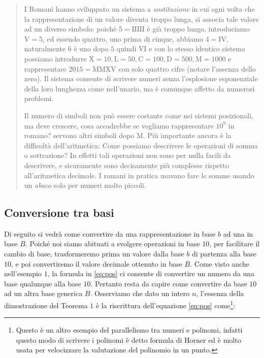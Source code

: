 \begin{quote}
I Romani hanno sviluppato un sistema a
\emph{sostituzione} in cui ogni volta che la rappresentazione di un valore
diventa troppo lunga, si associa tale valore ad un diverso simbolo: poiché $5 =
\mathrm{IIIII}$ è già troppo lungo, introduciamo $\mathrm{V} = 5$, ed essendo
quattro, uno prima di cinque, abbiamo $4 = \mathrm{IV}$, naturalmente $6$ è uno
dopo $5$ quindi $\mathrm{VI}$ e con lo stesso identico sistema possiamo
introdurre $\mathrm{X} = 10, \mathrm{L} = 50, \mathrm{C} = 100, \mathrm{D} =
500, \mathrm{M} = 1000$ e rappresentare $2015 = \mathrm{MMXV}$ con solo quattro
cifre (notare l'assenza dello zero). Il sistema consente di scrivere numeri
senza l'esplosione esponenziale della loro lunghezza come nell'unario, ma è
comunque affetto da numerosi problemi.

Il numero di simboli non può essere costante come nei sistemi posizionali, ma
deve crescere, cosa accadrebbe se vogliamo rappresentare $10^9$ in romano?
servono altri simboli dopo $\mathrm{M}$. Più importante ancora è la difficoltà
dell'aritmetica: Come possiamo descrivere le operazioni di somma o sottrazione?
In effetti tali operazioni non sono per nulla facili da descrivere, e
sicuramente sono decisamente più complesse rispetto all'aritmetica decimale. I
romani in pratica usavano fare le somme usando un \emph{abaco} solo per numeri
molto piccoli. 
\end{quote}


\subsection{Conversione tra basi}\label{sec:conversione}

Di seguito si vedrà come convertire da una rappresentazione in base $b$ ad una
in base $B$. Poiché noi siamo abituati a svolgere operazioni in base $10$, per
facilitare il cambio di base, trasformeremo prima un valore dalla base $b$ di
partenza alla base $10$, e poi convertiremo il valore decimale ottenuto in base
$B$. Come visto anche nell'esempio $1$, la formula in \eqref{eq:pos} ci
consente di convertire un numero da una base qualunque alla base $10$. Pertanto
resta da capire come convertire da base $10$ ad un altra base generica $B$.
Osserviamo che dato un intero $n$, l'essenza della dimostrazione del Teorema
$1$ è la riscrittura dell'equazione \eqref{eq:pos} come\footnote{Questo è un
altro esempio del parallelismo tra numeri e polinomi, infatti questo modo di
scrivere i polinomi è detto formula di Horner ed è molto usata per velocizzare
la valutazione del polinomio in un punto.}:

